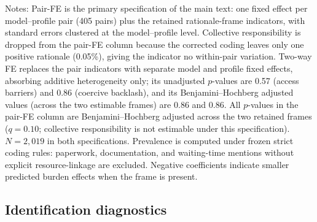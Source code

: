 \documentclass[11pt]{article}
\begin{document}
\begin{table}[htbp]
\centering
\caption{H2 frame--outcome estimates under the primary and secondary specifications}
\label{tab:h2_spec_comparison}
\begin{flushleft}
\footnotesize Notes: Pair-FE is the primary specification of the main text: one fixed effect per model--profile pair (405 pairs) plus the retained rationale-frame indicators, with standard errors clustered at the model--profile level. Collective responsibility is dropped from the pair-FE column because the corrected coding leaves only one positive rationale (0.05\%), giving the indicator no within-pair variation. Two-way FE replaces the pair indicators with separate model and profile fixed effects, absorbing additive heterogeneity only; its unadjusted \(p\)-values are 0.57 (access barriers) and 0.86 (coercive backlash), and its Benjamini--Hochberg adjusted values (across the two estimable frames) are 0.86 and 0.86. All \(p\)-values in the pair-FE column are Benjamini--Hochberg adjusted across the two retained frames (\(q=0.10\); collective responsibility is not estimable under this specification). \(N=2{,}019\) in both specifications. Prevalence is computed under frozen strict coding rules: paperwork, documentation, and waiting-time mentions without explicit resource-linkage are excluded. Negative coefficients indicate smaller predicted burden effects when the frame is present.
\end{flushleft}
\end{table}

\subsection*{Identification diagnostics}
\end{document}

